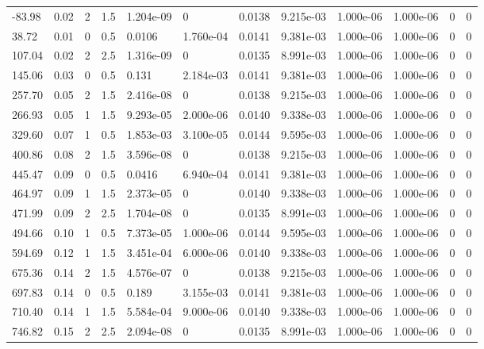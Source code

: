 \documentclass[preview]{standalone}
\begin{document}
{{\begin{tabular}{L{1.2cm}C{1.2cm} C{0.3cm}C{0.5cm} C{1.4cm}C{1.4cm} C{1.4cm}C{1.4cm} C{1.6cm}C{1.6cm} C{1.6cm}C{1.6cm}}
  -83.98  &  0.02  & 2     & 1.5 &  1.204e-09  & 0  &  0.0138&   9.215e-03& 1.000e-06 & 1.000e-06   &  0 & 0  \\ 
  38.72  &  0.01  & 0     & 0.5 &  0.0106  & 1.760e-04  &  0.0141&   9.381e-03& 1.000e-06 & 1.000e-06   &  0 & 0  \\ 
  107.04  &  0.02  & 2     & 2.5 &  1.316e-09  & 0  &  0.0135&   8.991e-03& 1.000e-06 & 1.000e-06   &  0 & 0  \\ 
  145.06  &  0.03  & 0     & 0.5 &  0.131  & 2.184e-03  &  0.0141&   9.381e-03& 1.000e-06 & 1.000e-06   &  0 & 0  \\ 
  257.70  &  0.05  & 2     & 1.5 &  2.416e-08  & 0  &  0.0138&   9.215e-03& 1.000e-06 & 1.000e-06   &  0 & 0  \\ 
  266.93  &  0.05  & 1     & 1.5 &  9.293e-05  & 2.000e-06  &  0.0140&   9.338e-03& 1.000e-06 & 1.000e-06   &  0 & 0  \\ 
  329.60  &  0.07  & 1     & 0.5 &  1.853e-03  & 3.100e-05  &  0.0144&   9.595e-03& 1.000e-06 & 1.000e-06   &  0 & 0  \\ 
  400.86  &  0.08  & 2     & 1.5 &  3.596e-08  & 0  &  0.0138&   9.215e-03& 1.000e-06 & 1.000e-06   &  0 & 0  \\ 
  445.47  &  0.09  & 0     & 0.5 &  0.0416  & 6.940e-04  &  0.0141&   9.381e-03& 1.000e-06 & 1.000e-06   &  0 & 0  \\ 
  464.97  &  0.09  & 1     & 1.5 &  2.373e-05  & 0  &  0.0140&   9.338e-03& 1.000e-06 & 1.000e-06   &  0 & 0  \\ 
  471.99  &  0.09  & 2     & 2.5 &  1.704e-08  & 0  &  0.0135&   8.991e-03& 1.000e-06 & 1.000e-06   &  0 & 0  \\ 
  494.66  &  0.10  & 1     & 0.5 &  7.373e-05  & 1.000e-06  &  0.0144&   9.595e-03& 1.000e-06 & 1.000e-06   &  0 & 0  \\ 
  594.69  &  0.12  & 1     & 1.5 &  3.451e-04  & 6.000e-06  &  0.0140&   9.338e-03& 1.000e-06 & 1.000e-06   &  0 & 0  \\ 
  675.36  &  0.14  & 2     & 1.5 &  4.576e-07  & 0  &  0.0138&   9.215e-03& 1.000e-06 & 1.000e-06   &  0 & 0  \\ 
  697.83  &  0.14  & 0     & 0.5 &  0.189  & 3.155e-03  &  0.0141&   9.381e-03& 1.000e-06 & 1.000e-06   &  0 & 0  \\ 
  710.40  &  0.14  & 1     & 1.5 &  5.584e-04  & 9.000e-06  &  0.0140&   9.338e-03& 1.000e-06 & 1.000e-06   &  0 & 0  \\ 
  746.82  &  0.15  & 2     & 2.5 &  2.094e-08  & 0  &  0.0135&   8.991e-03& 1.000e-06 & 1.000e-06   &  0 & 0  \\ 

\end{tabular}}}
\end{document}
